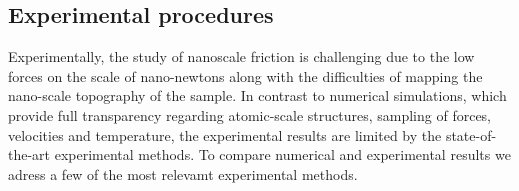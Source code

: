 







\subsection{Experimental procedures}

Experimentally, the study of nanoscale friction is challenging due to the low
forces on the scale of nano-newtons along with the difficulties of mapping the
nano-scale topography of the sample. In contrast to numerical simulations, which provide full
transparency regarding atomic-scale structures, sampling of forces, velocities
and temperature, the experimental results are limited by the state-of-the-art
experimental methods. To compare numerical and experimental results we adress a few of the most relevamt experimental methods.

